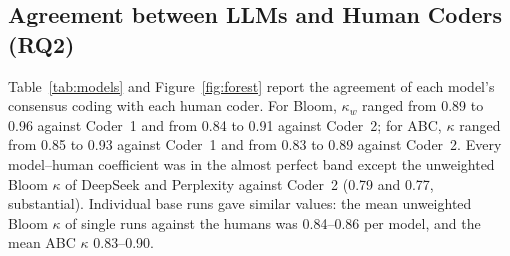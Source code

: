 \documentclass[journal,article,submit,pdftex,moreauthors]{Definitions/mdpi}
\begin{document}
\subsection{Agreement between LLMs and Human Coders (RQ2)}
\label{sec:res_llm}

Table~\ref{tab:models} and Figure~\ref{fig:forest} report the agreement of each model's consensus coding with each human coder. For Bloom, $\kappa_w$ ranged from 0.89 to 0.96 against Coder~1 and from 0.84 to 0.91 against Coder~2; for ABC, $\kappa$ ranged from 0.85 to 0.93 against Coder~1 and from 0.83 to 0.89 against Coder~2. Every model--human coefficient was in the almost perfect band except the unweighted Bloom $\kappa$ of DeepSeek and Perplexity against Coder~2 (0.79 and 0.77, substantial). Individual base runs gave similar values: the mean unweighted Bloom $\kappa$ of single runs against the humans was 0.84--0.86 per model, and the mean ABC $\kappa$ 0.83--0.90.
\end{document}
